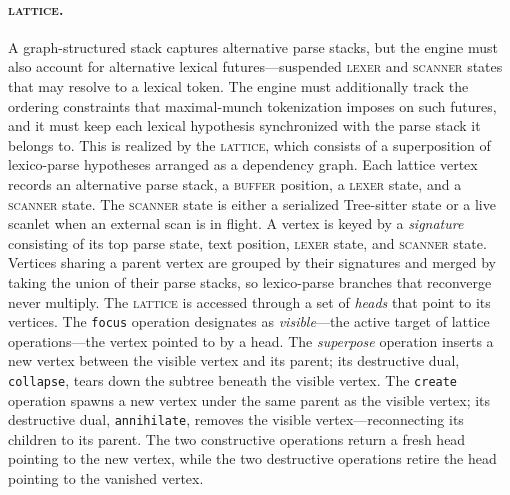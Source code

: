 \documentclass[11pt]{article}
\theoremstyle{plain}
\theoremstyle{definition}
\begin{document}
\paragraph{\textsc{lattice}.} A graph-structured stack captures alternative
parse stacks, but the engine must also account for alternative lexical
futures---suspended \textsc{lexer} and \textsc{scanner} states that may resolve
to a lexical token. The engine must additionally track the ordering constraints
that maximal-munch tokenization imposes on such futures, and it must keep each
lexical hypothesis synchronized with the parse stack it belongs to. This is
realized by the \textsc{lattice}, which consists of a superposition of
lexico-parse hypotheses arranged as a dependency graph. Each lattice vertex
records an alternative parse stack, a \textsc{buffer} position, a \textsc{lexer}
state, and a \textsc{scanner} state. The \textsc{scanner} state is either a
serialized Tree-sitter state or a live scanlet when an external scan is in
flight. A vertex is keyed by a \emph{signature} consisting of its top parse
state, text position, \textsc{lexer} state, and \textsc{scanner} state. Vertices
sharing a parent vertex are grouped by their signatures and merged by taking the
union of their parse stacks, so lexico-parse branches that reconverge never
multiply. The \textsc{lattice} is accessed through a set of \emph{heads} that
point to its vertices. The \texttt{focus} operation designates as
\emph{visible}---the active target of lattice operations---the vertex pointed to
by a head. The \emph{superpose} operation inserts a new vertex between the
visible vertex and its parent; its destructive dual, \texttt{collapse}, tears
down the subtree beneath the visible vertex. The \texttt{create} operation
spawns a new vertex under the same parent as the visible vertex; its destructive
dual, \texttt{annihilate}, removes the visible vertex---reconnecting its
children to its parent. The two constructive operations return a fresh head
pointing to the new vertex, while the two destructive operations retire the head
pointing to the vanished vertex.
\end{document}
